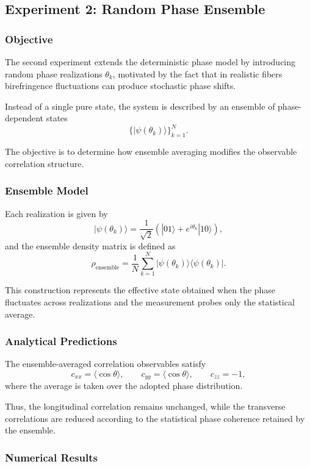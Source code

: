 \documentclass[a4paper]{article}
\begin{document}
\subsection{Experiment 2: Random Phase Ensemble}

\subsubsection{Objective}

The second experiment extends the deterministic phase model by introducing random phase realizations \(\theta_k\), motivated by the fact that in realistic fibers birefringence fluctuations can produce stochastic phase shifts.

Instead of a single pure state, the system is described by an ensemble of phase-dependent states
\[
\{ |\psi(\theta_k)\rangle \}_{k=1}^{N}.
\]

The objective is to determine how ensemble averaging modifies the observable correlation structure.

\subsubsection{Ensemble Model}

Each realization is given by
\[
|\psi(\theta_k)\rangle
=
\frac{1}{\sqrt{2}}
\left(
|01\rangle + e^{i\theta_k}|10\rangle
\right),
\]
and the ensemble density matrix is defined as
\[
\rho_{\mathrm{ensemble}}
=
\frac{1}{N}
\sum_{k=1}^{N}
|\psi(\theta_k)\rangle\langle \psi(\theta_k)|.
\]

This construction represents the effective state obtained when the phase fluctuates across realizations and the measurement probes only the statistical average.

\subsubsection{Analytical Predictions}

The ensemble-averaged correlation observables satisfy
\[
c_{xx} = \langle \cos\theta \rangle,\qquad
c_{yy} = \langle \cos\theta \rangle,\qquad
c_{zz} = -1,
\]
where the average is taken over the adopted phase distribution.

Thus, the longitudinal correlation remains unchanged, while the transverse correlations are reduced according to the statistical phase coherence retained by the ensemble.

\subsubsection{Numerical Results}
\end{document}
